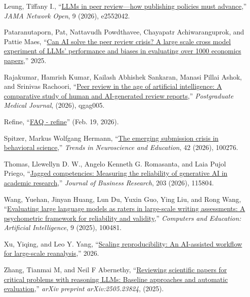 \documentclass[
  11pt,
  letterpaper,
]{article}
\newlength{\cslhangindent}
\newenvironment{CSLReferences}[2] %
 {\begin{list}{}{%
  \setlength{\itemindent}{0pt}
  \setlength{\leftmargin}{0pt}
  \setlength{\parsep}{0pt}
  \ifodd #1
   \setlength{\leftmargin}{\cslhangindent}
   \setlength{\itemindent}{-1\cslhangindent}
  \fi
  \setlength{\itemsep}{#2\baselineskip}}}
 {\end{list}}
\begin{document}
\begin{CSLReferences}{1}{0}
Leung, Tiffany I.,
{``\href{https://doi.org/10.1001/jamanetworkopen.2025.52042}{LLMs in
peer review---how publishing policies must advance},''} \emph{JAMA
Network Open}, 9 (2026), e2552042.

Pataranutaporn, Pat, Nattavudh Powdthavee, Chayapatr Achiwaranguprok,
and Pattie Maes, {``\href{https://doi.org/10.48550/arXiv.2502.00070}{Can
AI solve the peer review crisis? A large scale cross model experiment of
LLMs' performance and biases in evaluating over 1000 economics
papers},''} 2025.

Rajakumar, Hamrish Kumar, Kailash Abhishek Sankaran, Manasi Pillai
Ashok, and Srinivas Rachoori,
{``\href{https://doi.org/10.1093/postmj/qgag005}{Peer review in the age
of artificial intelligence: A comparative study of human and
AI-generated review reports},''} \emph{Postgraduate Medical Journal},
(2026), qgag005.

Refine, {``\href{https://www.refine.ink/faq}{FAQ - refine}''} (Feb. 19,
2026).

Spitzer, Markus Wolfgang Hermann,
{``\href{https://doi.org/10.1016/j.tine.2026.100276}{The emerging
submission crisis in behavioral science},''} \emph{Trends in
Neuroscience and Education}, 42 (2026), 100276.

Thomas, Llewellyn D. W., Angelo Kenneth G. Romasanta, and Laia Pujol
Priego, {``\href{https://doi.org/10.1016/j.jbusres.2025.115804}{Jagged
competencies: Measuring the reliability of generative AI in academic
research},''} \emph{Journal of Business Research}, 203 (2026), 115804.

Wang, Yuehan, Jinyan Huang, Lun Du, Yuxin Guo, Ying Liu, and Rong Wang,
{``\href{https://doi.org/10.1016/j.caeai.2025.100481}{Evaluating large
language models as raters in large-scale writing assessments: A
psychometric framework for reliability and validity},''} \emph{Computers
and Education: Artificial Intelligence}, 9 (2025), 100481.

Xu, Yiqing, and Leo Y. Yang,
{``\href{https://yiqingxu.org/papers/2026_ai/AI_reproducibility.pdf}{Scaling
reproducibility: An AI-assisted workflow for large-scale reanalysis},''}
2026.

Zhang, Tianmai M, and Neil F Abernethy,
{``\href{https://arxiv.org/abs/2505.23824v2}{Reviewing scientific papers
for critical problems with reasoning LLMs: Baseline approaches and
automatic evaluation},''} \emph{arXiv preprint arXiv:2505.23824},
(2025).

\end{CSLReferences}
\end{document}
